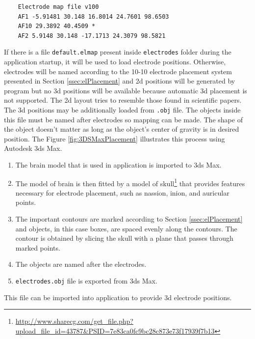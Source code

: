 \lstset{captionpos=b, caption=Electrode map file example, label=lst:ElMap}
\begin{lstlisting}
    Electrode map file v100
    AF1 -5.91481 30.148 16.8014 24.7601 98.6503
    AF10 29.3892 40.4509 *
    AF2 5.9148 30.148 -17.1713 24.3079 98.5821
\end{lstlisting}

If there is a file \texttt{default.elmap} present inside \texttt{electrodes} folder during the application startup, it will be used to load electrode positions. Otherwise, electrodes will be named according to the 10-10 electrode placement system presented in Section \ref{ssec:elPlacement} and \gls{2d} positions will be generated by program but no \gls{3d} positions will be available because automatic \gls{3d} placement is not supported. The \gls{2d} layout tries to resemble those found in scientific papers. The \gls{3d} positions may be additionally loaded from \texttt{.obj} file. The objects inside this file must be named after electrodes so mapping can be made. The shape of the object doesn't matter as long as the object's center of gravity is in desired position. The Figure \ref{fig:3DSMaxPlacement} illustrates this process using Autodesk 3ds Max. 
\begin{enumerate}
	\item The brain model that is used in application is imported to 3ds Max.
	\item The model of brain is then fitted by a model of skull\footnote{\url{http://www.sharecg.com/get_file.php?upload_file_id=43787&PSID=7e83ca0fc9bc28c873e73f17939f7b13}} that provides features necessary for electrode placement, such as nassion, inion, and auricular points.
	\item The important contours are marked according to Section \ref{ssec:elPlacement} and objects, in this case boxes, are spaced evenly along the contours. The contour is obtained by slicing the skull with a plane that passes through marked points. 
	\item The objects are named after the electrodes.
	\item \texttt{electrodes.obj} file is exported from 3ds Max.
\end{enumerate}
This file can be imported into application to provide \gls{3d} electrode positions.

